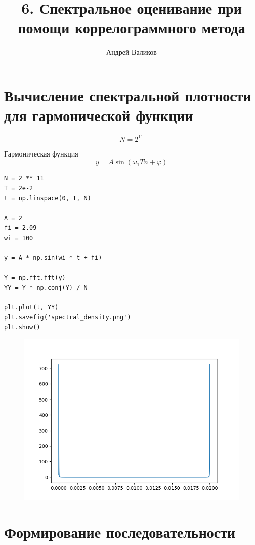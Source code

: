 \documentclass[12pt]{article}
\begin{document}
\title{6. Спектральное оценивание при помощи коррелограммного метода}
\author{Андрей Валиков}
\date{}
\maketitle
																																																								\section{Вычисление спектральной плотности для гармонической функции}
																																																	
\[N = 2^{11}\]  

Гармоническая функция
\[y=A\sin(\omega_{1}Tn + \varphi)\]
	

\begin{lstlisting}
N = 2 ** 11
T = 2e-2
t = np.linspace(0, T, N)

A = 2
fi = 2.09
wi = 100

y = A * np.sin(wi * t + fi)

Y = np.fft.fft(y)
YY = Y * np.conj(Y) / N

plt.plot(t, YY)
plt.savefig('spectral_density.png')
plt.show()
\end{lstlisting}

\begin{figure}[!htb]
\centering
\includegraphics[scale=1.00]{spectral_density.png}
\caption{}
\label{}
\end{figure}


\section{Формирование последовательности}
\end{document}
